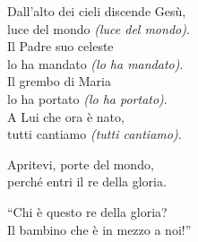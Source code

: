 
\strofa Dall'alto dei cieli discende Gesù,\\
luce del mondo \emph{(luce del mondo)}.\\
Il Padre suo celeste\\
lo ha mandato \emph{(lo ha mandato)}.\\
Il grembo di Maria\\
lo ha portato \emph{(lo ha portato)}.\\
A Lui che ora è nato,\\
tutti cantiamo \emph{(tutti cantiamo)}.

\spazio

 

\spazio

\strofa Apritevi, porte del mondo,\\
perché entri il re della gloria.

\spazio


\spazio

\strofa ``Chi è questo re della gloria?\\
Il bambino che è in mezzo a noi!''

\spazio

